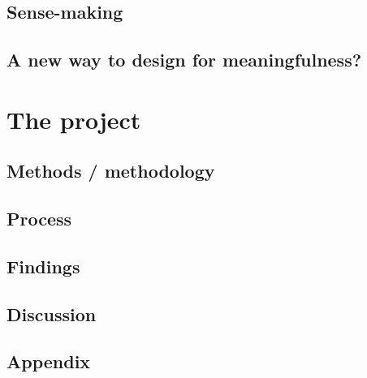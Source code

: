 \documentclass[UKenglish]{ifimaster}
\begin{document}
\chapter{Sense-making}

\chapter{A new way to design for meaningfulness?}


\part{The project}
\chapter{Methods / methodology}

\chapter{Process}


\chapter{Findings}
\chapter{Discussion}

\backmatter{}
\printbibliography

\appendix
\chapter{Appendix}

\end{document}
